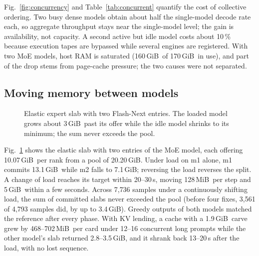 \documentclass[10pt,conference,a4paper]{IEEEtran}
\newcommand{\GiB}{\,GiB}
\newcommand{\MiB}{\,MiB}
\begin{document}
Fig.~\ref{fig:concurrency} and Table~\ref{tab:concurrent} quantify the cost of collective ordering.
Two busy dense models obtain about half the single-model decode rate each, so aggregate throughput
stays near the single-model level; the gain is availability, not capacity. A second active but idle
model costs about 10\,\% because execution tapes are bypassed while several engines are registered.
With two MoE models, host RAM is saturated (160\GiB\ of 170\GiB\ in use), and part of the drop
stems from page-cache pressure; the two causes were not separated.

\subsection{Moving memory between models}

\begin{figure}[t]
\centering
{}
\caption{Elastic expert slab with two Flash-Next entries. The loaded model grows about 3\GiB\ past
its offer while the idle model shrinks to its minimum; the sum never exceeds the pool.}
\label{fig:elastic}
\end{figure}

Fig.~\ref{fig:elastic} shows the elastic slab with two entries of the MoE model, each offering
10.07\GiB\ per rank from a pool of 20.20\GiB. Under load on m1 alone, m1 commits 13.1\GiB\ while m2
falls to 7.1\GiB; reversing the load reverses the split. A change of load reaches its target within
20--30\,s, moving 128\MiB\ per step and 5\GiB\ within a few seconds. Across 7{,}736 samples under a
continuously shifting load, the sum of committed slabs never exceeded the pool (before four fixes,
3{,}561 of 4{,}793 samples did, by up to 3.4\GiB). Greedy outputs of both models matched the
reference after every phase. With KV lending, a cache with a 1.9\GiB\ carve grew by 468--702\MiB\
per card under 12--16 concurrent long prompts while the other model's slab returned 2.8--3.5\GiB, and
it shrank back 13--20\,s after the load, with no lost sequence.
\end{document}
